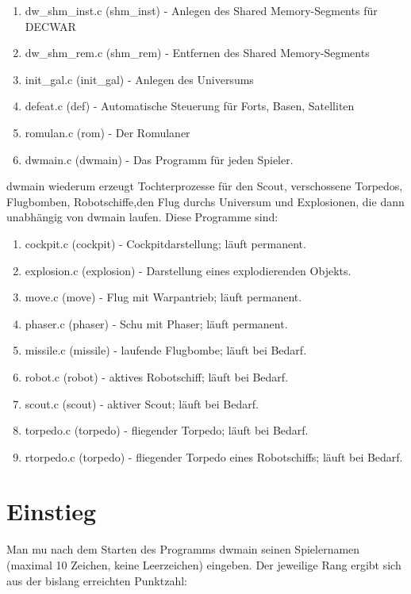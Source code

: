 \begin{enumerate}
\item dw\_shm\_inst.c (shm\_inst) - Anlegen des Shared Memory-Segments f\"ur DECWAR
\item dw\_shm\_rem.c (shm\_rem) - Entfernen des Shared Memory-Segments
\item init\_gal.c (init\_gal) - Anlegen des Universums
\item defeat.c (def) - Automatische Steuerung f\"ur Forts, Basen, Satelliten
\item romulan.c (rom) - Der Romulaner
\item dwmain.c (dwmain) - Das Programm f\"ur jeden Spieler.
\end{enumerate}

dwmain wiederum erzeugt Tochterprozesse f\"ur den Scout, verschossene
Torpedos, Flugbomben, Robotschiffe,den Flug durchs Universum und Explosionen, 
die dann unabh\"angig von dwmain laufen. Diese Programme sind:

\begin{enumerate}
\item cockpit.c (cockpit) - Cockpitdarstellung; l\"auft permanent.
\item explosion.c (explosion) - Darstellung eines explodierenden Objekts.
\item move.c (move) - Flug mit Warpantrieb; l\"auft permanent.
\item phaser.c (phaser) - Schu\3 mit Phaser;  l\"auft permanent.
\item missile.c (missile) - laufende Flugbombe;   l\"auft bei Bedarf.
\item robot.c (robot) - aktives Robotschiff;   l\"auft bei Bedarf.
\item scout.c (scout) - aktiver Scout;  l\"auft bei Bedarf.
\item torpedo.c (torpedo) - fliegender Torpedo;  l\"auft bei Bedarf.
\item rtorpedo.c (torpedo) - fliegender Torpedo eines Robotschiffs; 
       l\"auft bei Bedarf.
\end{enumerate}

\section{Einstieg}

Man mu\3 nach dem Starten des Programms dwmain seinen Spielernamen 
(maximal 10 Zeichen, keine Leerzeichen) eingeben. Der jeweilige
Rang ergibt sich aus der bislang erreichten Punktzahl:


